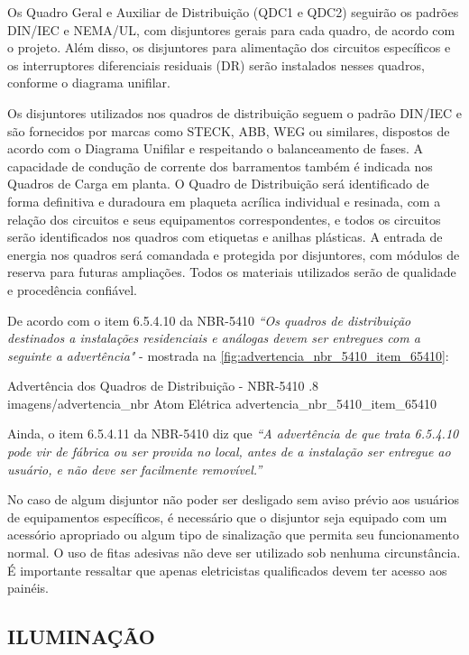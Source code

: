 Os Quadro Geral e Auxiliar de Distribuição (QDC1 e QDC2) seguirão os padrões DIN/IEC e NEMA/UL, com disjuntores gerais para cada quadro, de acordo com o projeto. Além disso, os disjuntores para alimentação dos circuitos específicos e os interruptores diferenciais residuais (DR) serão instalados nesses quadros, conforme o diagrama unifilar.

Os disjuntores utilizados nos quadros de distribuição seguem o padrão DIN/IEC e são fornecidos por marcas como STECK, ABB, WEG ou similares, dispostos de acordo com o Diagrama Unifilar e respeitando o balanceamento de fases. A capacidade de condução de corrente dos barramentos também é indicada nos Quadros de Carga em planta. O Quadro de Distribuição será identificado de forma definitiva e duradoura em plaqueta acrílica individual e resinada, com a relação dos circuitos e seus equipamentos correspondentes, e todos os circuitos serão identificados nos quadros com etiquetas e anilhas plásticas. A entrada de energia nos quadros será comandada e protegida por disjuntores, com módulos de reserva para futuras ampliações. Todos os materiais utilizados serão de qualidade e procedência confiável.

De acordo com o item 6.5.4.10 da NBR-5410 \textit{``Os quadros de distribuição destinados a instalações residenciais e análogas devem ser entregues com a seguinte a advertência"} - mostrada na \autoref{fig:advertencia_nbr_5410_item_65410}:

\figura
{Advertência dos Quadros de Distribuição - NBR-5410} %
{.8} %
{imagens/advertencia_nbr} %
{Atom Elétrica} %
{advertencia_nbr_5410_item_65410} %
{}
{}

Ainda, o item 6.5.4.11 da NBR-5410 diz que \textit{``A advertência de que trata 6.5.4.10 pode vir de fábrica ou ser provida no local, antes de a instalação ser entregue ao usuário, e não deve ser facilmente removível.''}

No caso de algum disjuntor não poder ser desligado sem aviso prévio aos usuários de equipamentos específicos, é necessário que o disjuntor seja equipado com um acessório apropriado ou algum tipo de sinalização que permita seu funcionamento normal. O uso de fitas adesivas não deve ser utilizado sob nenhuma circunstância. É importante ressaltar que apenas eletricistas qualificados devem ter acesso aos painéis.

\subsection{ILUMINAÇÃO}

